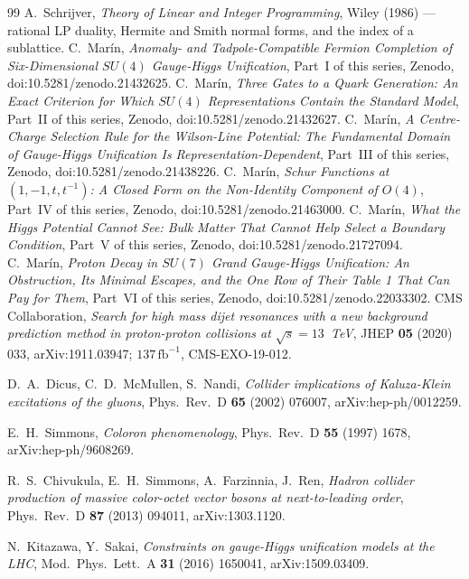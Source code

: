 \documentclass[11pt,a4paper]{article}
\newcommand{\su}[1]{SU(#1)}
\begin{document}
\begin{thebibliography}{99}
 A.~Schrijver, \emph{Theory of Linear and Integer Programming}, Wiley (1986) --- rational LP duality, Hermite and Smith normal forms, and the index of a sublattice.
 C.~Mar\'in, \emph{Anomaly- and Tadpole-Compatible Fermion Completion of Six-Dimensional $\su4$ Gauge-Higgs Unification}, Part~I of this series, Zenodo, doi:10.5281/zenodo.21432625.
 C.~Mar\'in, \emph{Three Gates to a Quark Generation: An Exact Criterion for Which $\su4$ Representations Contain the Standard Model}, Part~II of this series, Zenodo, doi:10.5281/zenodo.21432627.
 C.~Mar\'in, \emph{A Centre-Charge Selection Rule for the Wilson-Line Potential: The Fundamental Domain of Gauge-Higgs Unification Is Representation-Dependent}, Part~III of this series, Zenodo, doi:10.5281/zenodo.21438226.
 C.~Mar\'in, \emph{Schur Functions at $(1,-1,t,t^{-1})$: A Closed Form on the Non-Identity Component of $O(4)$}, Part~IV of this series, Zenodo, doi:10.5281/zenodo.21463000.
 C.~Mar\'in, \emph{What the Higgs Potential Cannot See: Bulk Matter That Cannot Help Select a Boundary Condition}, Part~V of this series, Zenodo, doi:10.5281/zenodo.21727094.
 C.~Mar\'in, \emph{Proton Decay in $\su7$ Grand Gauge-Higgs Unification: An Obstruction, Its Minimal Escapes, and the One Row of Their Table 1 That Can Pay for Them}, Part~VI of this series, Zenodo, doi:10.5281/zenodo.22033302.
 CMS Collaboration, \emph{Search for high mass dijet resonances with a new background prediction method in proton-proton collisions at $\sqrt{s}=13$~TeV}, JHEP \textbf{05} (2020) 033, arXiv:1911.03947; $137\,\mathrm{fb}^{-1}$, CMS-EXO-19-012.

 D.~A.~Dicus, C.~D.~McMullen, S.~Nandi, \emph{Collider implications of Kaluza-Klein excitations of the gluons}, Phys.\ Rev.\ D \textbf{65} (2002) 076007, arXiv:hep-ph/0012259.

 E.~H.~Simmons, \emph{Coloron phenomenology}, Phys.\ Rev.\ D \textbf{55} (1997) 1678, arXiv:hep-ph/9608269.

 R.~S.~Chivukula, E.~H.~Simmons, A.~Farzinnia, J.~Ren, \emph{Hadron collider production of massive color-octet vector bosons at next-to-leading order}, Phys.\ Rev.\ D \textbf{87} (2013) 094011, arXiv:1303.1120.

 N.~Kitazawa, Y.~Sakai, \emph{Constraints on gauge-Higgs unification models at the LHC}, Mod.\ Phys.\ Lett.\ A \textbf{31} (2016) 1650041, arXiv:1509.03409.


\end{thebibliography}
\end{document}
